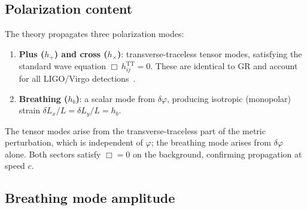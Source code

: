 \documentclass[aps,prd,onecolumn,superscriptaddress,nofootinbib,showpacs,12pt]{revtex4-2}
\begin{document}
\subsection{Polarization content}\label{sec:gw_pol}

The theory propagates three polarization modes:
\begin{enumerate}
\item \textbf{Plus ($h_{+}$) and cross ($h_{\times}$)}:
  transverse-traceless tensor modes, satisfying the standard
  wave equation $\Box\,h_{ij}^{\mathrm{TT}} = 0$.  These are
  identical to GR and account for all LIGO/Virgo
  detections~\cite{LIGO2016}.
\item \textbf{Breathing ($h_{b}$)}: a scalar mode from
  $\delta\varphi$, producing isotropic (monopolar) strain
  $\delta L_{x}/L = \delta L_{y}/L = h_{b}$.
\end{enumerate}
The tensor modes arise from the transverse-traceless part
of the metric perturbation, which is independent of
$\varphi$; the breathing mode arises from $\delta\varphi$
alone.  Both sectors satisfy $\Box = 0$ on the background,
confirming propagation at speed $c$.

\subsection{Breathing mode amplitude}\label{sec:breathing}
\end{document}

